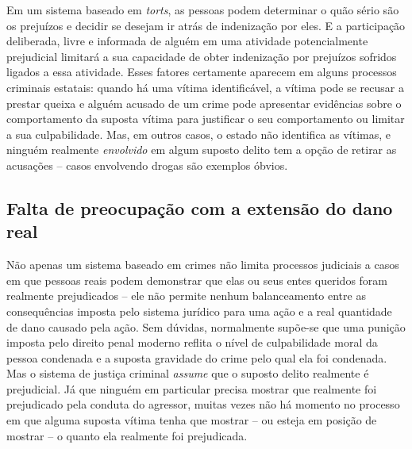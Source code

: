 Em um sistema baseado em \emph{torts}, as pessoas podem determinar o quão sério são os prejuízos e decidir se desejam ir atrás de indenização por eles. E a participação deliberada, livre e informada de alguém em uma atividade potencialmente prejudicial limitará a sua capacidade de obter indenização por prejuízos sofridos ligados a essa atividade. Esses fatores certamente aparecem em alguns processos criminais estatais: quando há uma vítima identificável, a vítima pode se recusar a prestar queixa e alguém acusado de um crime pode apresentar evidências sobre o comportamento da suposta vítima para justificar o seu comportamento ou limitar a sua culpabilidade. Mas, em outros casos, o estado não identifica as vítimas, e ninguém realmente \emph{envolvido} em algum suposto delito tem a opção de retirar as acusações -- casos envolvendo drogas são exemplos óbvios.

\subsection*{Falta de preocupação com a extensão do dano real}

Não apenas um sistema baseado em crimes não limita processos judiciais a casos em que pessoas reais podem demonstrar que elas ou seus entes queridos foram realmente prejudicados -- ele não permite nenhum balanceamento entre as consequências imposta pelo sistema jurídico para uma ação e a real quantidade de dano causado pela ação. Sem dúvidas, normalmente supõe-se que uma punição imposta pelo direito penal moderno reflita o nível de culpabilidade moral da pessoa condenada e a suposta gravidade do crime pelo qual ela foi condenada. Mas o sistema de justiça criminal \emph{assume} que o suposto delito realmente é prejudicial. Já que ninguém em particular precisa mostrar que realmente foi prejudicado pela conduta do agressor, muitas vezes não há momento no processo em que alguma suposta vítima tenha que mostrar -- ou esteja em posição de mostrar -- o quanto ela realmente foi prejudicada.

